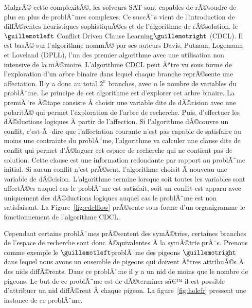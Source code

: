 MalgrÃ© cette complexitÃ©, les solveurs SAT sont capables de rÃ©soudre de plus en plus de problÃ¨mes complexes.
Ce succÃ¨s vient de l'introduction de diffÃ©rentes heuristiques sophistiquÃ©es et de 
l'algorithme de rÃ©solution, le $\guillemotleft$ Conflict Driven Clause Learning$\guillemotright$ (CDCL).
Il est basÃ© sur l'algorithme nommÃ© par ses auteurs Davis, Putnam, Logemann et Loveland (DPLL)\cite{dpll_62},
l'un des premier algorithme avec une utilisation non intensive de la mÃ©moire.
%
%
%
L'algorithme CDCL peut Ãªtre vu sous forme de l'exploration d'un arbre binaire dans lequel  chaque branche reprÃ©sente 
une affectation. Il y a donc au total $2^n$ branches, avec $n$ le nombre de variables du problÃ¨me.
Le principe de cet algorithme est d'explorer cet arbre binaire. 
La premiÃ¨re Ã©tape consiste Ã  choisir une variable dite de dÃ©cision avec une polaritÃ© qui permet l'exploration
de l'arbre de recherche. Puis, d'effectuer les dÃ©ductions logiques Ã  partir de l'affection. 
Si l'algorithme dÃ©couvre un conflit, c'est-Ã -dire que l'affectation courante n'est pas capable de satisfaire au moins une contrainte du problÃ¨me, l'algorithme va calculer une clause dite de conflit qui permet d'Ã©laguer 
cet espace de recherche qui ne contient pas de solution. Cette clause est une information redondante par
rapport au problÃ¨me initial. Si aucun conflit n'est prÃ©sent, l'algorithme choisit Ã  nouveau une variable de dÃ©cision. L'algorithme termine lorsque soit toutes les variables sont affectÃ©es auquel cas le problÃ¨me 
est satisfait, soit un conflit est apparu avec uniquement des dÃ©ductions logiques auquel cas le
problÃ¨me est non satisfaisant.
La Figure~\ref{fig:cdclflow} prÃ©sente sous forme d'un organigramme le fonctionnement de l'algorithme CDCL.


Cependant certains problÃ¨mes prÃ©sentent des symÃ©tries, certaines branches de l'espace de recherche 
sont donc Ã©quivalentes Ã  la symÃ©trie prÃ¨s. Prenons comme exemple le $\guillemotleft$problÃ¨me des pigeons $\guillemotright$ dans lequel nous avons un ensemble de pigeons qui doivent Ãªtres attribuÃ©s Ã  des nids diffÃ©rents. Dans ce problÃ¨me il y a un nid de moins que le nombre de pigeons.
Le but de ce problÃ¨me est de dÃ©terminer sâ€™ il est possible d'attribuer un nid diffÃ©rent Ã  chaque pigeon.
 La figure~\ref{fig:holefr} pressent une instance de ce problÃ¨me.
 
